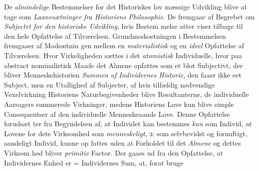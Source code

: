 De \emph{almindelige} Bestemmelser for det Historiskes lov\-%
mæssige Udvikling blive at tage som \emph{Laanesætninger fra
Historiens Philosophie}. De fremgaae af Begrebet om
\emph{Subjectet for den historiske Udvikling}, hvis Bestem\-%
melse atter viser tilbage til den hele Opfattelse af Tilværelsen.
Grundmodsætningen i Bestemmelsen fremgaaer af Modsætnin\-%
gen mellem en \emph{materialistisk} og en \emph{ideel} Opfattelse af
Tilværelsen. Hvor Virkeligheden sættes i det \emph{atomistisk}
Individuelle, hvor paa abstract nominalistisk Maade det Almene
opfattes som et blot Subjectivt, der bliver Menneskehistorien
\emph{Summen af Individernes Historie}, den faaer ikke eet
Subject, men en Utallighed af Subjecter, af hvis tilfældig\-%
nødvendige Vexelvirkning Historiens Naturbegivenheder blive
Resultanterne, de individuelle Aarsagers summerede Virkninger,
medens Historiens Love kun blive simple Consequentser af den
individuelle Menneskeaands Love. Denne Opfattelse forudsæt\-%
ter fra Begyndelsen af, at Individet kan bestemmes \emph{kun} som
 Individ, at Lovene for dets Virksomhed som \emph{menneskeligt},
ɔ: som selvbevidst og fornuftigt, aandeligt Individ, kunne op\-%
fattes uden at Forholdet til det \emph{Almene} og dettes Virksom\-%
hed bliver \emph{primitiv} Factor. Der gaaes ud fra den Opfattelse,
at Individernes Enhed er = Individernes Sum, at, forat bruge
